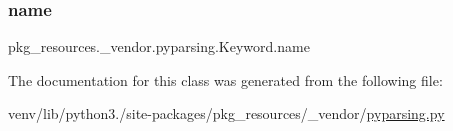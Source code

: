 \subsubsection{\texorpdfstring{name}{name}}
{\footnotesize\ttfamily pkg\+\_\+resources.\+\_\+vendor.\+pyparsing.\+Keyword.\+name}



The documentation for this class was generated from the following file\+:\begin{DoxyCompactItemize}
\item 
venv/lib/python3./site-\/packages/pkg\+\_\+resources/\+\_\+vendor/\hyperlink{pkg__resources_2__vendor_2pyparsing_8py}{pyparsing.\+py}\end{DoxyCompactItemize}
